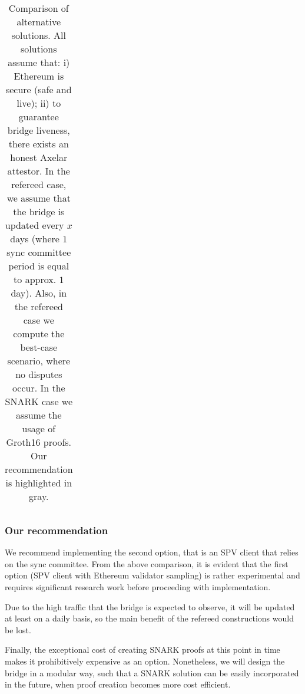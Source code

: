 \begin{table}
{\begin{tabular}{|c|c|!{\vrule width 1pt}>{}c!{\vrule width 1pt}|c|c|c|}
        \hline
    \end{tabular}
    }
    \caption{Comparison of alternative solutions. All solutions assume that: i)
    Ethereum is secure (safe and live); ii) to guarantee bridge liveness, there
    exists an honest Axelar attestor. In the refereed case, we assume that the
    bridge is updated every $x$ days (where $1$ sync committee period is equal
    to approx. $1$ day). Also, in the refereed case we compute the best-case
    scenario, where no disputes occur. In the SNARK case we assume the usage of
    Groth16 proofs. Our recommendation is highlighted in gray.}
    \label{tab:comparison}
\end{table}

\subsubsection*{Our recommendation}
We recommend implementing the second option, that is an SPV client that relies
on the sync committee. From the above comparison, it is evident that the
first option (SPV client with Ethereum validator sampling) is rather
experimental and requires significant research work before proceeding with
implementation.

Due to the high traffic that the bridge is expected to observe, it will
be updated at least on a daily basis, so the main
benefit of the refereed constructions would be lost.

Finally, the exceptional cost of creating SNARK proofs at this point in time
makes it prohibitively expensive as an option. Nonetheless, we will design the
bridge in a modular way, such that a SNARK solution can be easily incorporated
in the future, when proof creation becomes more cost efficient.
